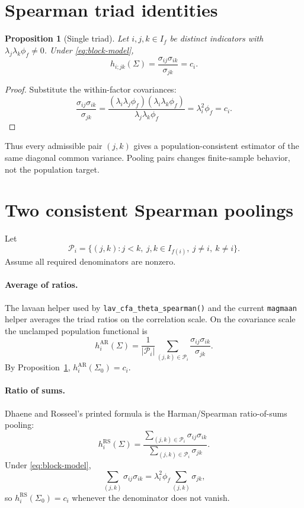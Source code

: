 \documentclass[11pt]{article}
\theoremstyle{plain}
\newtheorem{proposition}{Proposition}
\theoremstyle{remark}
\begin{document}
\section{Spearman triad identities}

\begin{proposition}[Single triad]\label{prop:triad}
Let \(i,j,k\in I_f\) be distinct indicators with
\(\lambda_j\lambda_k\phi_f\ne0\). Under \eqref{eq:block-model},
\begin{equation}\label{eq:single-triad}
  h_{i;jk}(\Sigma)
  =
  \frac{\sigma_{ij}\sigma_{ik}}{\sigma_{jk}}
  =
  c_i .
\end{equation}
\end{proposition}

\begin{proof}
Substitute the within-factor covariances:
\[
  \frac{\sigma_{ij}\sigma_{ik}}{\sigma_{jk}}
  =
  \frac{(\lambda_i\lambda_j\phi_f)(\lambda_i\lambda_k\phi_f)}
       {\lambda_j\lambda_k\phi_f}
  =
  \lambda_i^2\phi_f
  =
  c_i .
\]
\end{proof}

Thus every admissible pair \((j,k)\) gives a population-consistent estimator of
the same diagonal common variance. Pooling pairs changes finite-sample behavior,
not the population target.

\section{Two consistent Spearman poolings}

Let
\[
  \mathcal P_i=\{(j,k): j<k,\ j,k\in I_{f(i)},\ j\ne i,\ k\ne i\}.
\]
Assume all required denominators are nonzero.

\paragraph{Average of ratios.}
The lavaan helper used by \texttt{lav\_cfa\_theta\_spearman()} and the current
\texttt{magmaan} helper averages the triad ratios on the correlation scale. On
the covariance scale the unclamped population functional is
\begin{equation}\label{eq:avg-ratio}
  h_i^{\mathrm{AR}}(\Sigma)
  =
  \frac{1}{|\mathcal P_i|}
  \sum_{(j,k)\in\mathcal P_i}
  \frac{\sigma_{ij}\sigma_{ik}}{\sigma_{jk}} .
\end{equation}
By Proposition~\ref{prop:triad}, \(h_i^{\mathrm{AR}}(\Sigma_0)=c_i\).

\paragraph{Ratio of sums.}
Dhaene and Rosseel's printed formula is the Harman/Spearman ratio-of-sums
pooling:
\begin{equation}\label{eq:ratio-sums}
  h_i^{\mathrm{RS}}(\Sigma)
  =
  \frac{\sum_{(j,k)\in\mathcal P_i}\sigma_{ij}\sigma_{ik}}
       {\sum_{(j,k)\in\mathcal P_i}\sigma_{jk}} .
\end{equation}
Under \eqref{eq:block-model},
\[
  \sum_{(j,k)}\sigma_{ij}\sigma_{ik}
  =
  \lambda_i^2\phi_f
  \sum_{(j,k)}\sigma_{jk},
\]
so \(h_i^{\mathrm{RS}}(\Sigma_0)=c_i\) whenever the denominator does not vanish.
\end{document}
